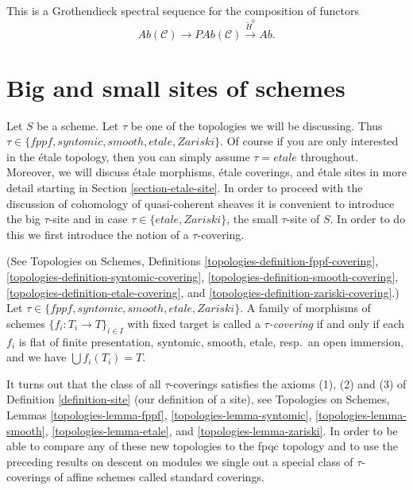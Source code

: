 \begin{remark}
\label{remark-grothendieck-ss}
This is a Grothendieck spectral sequence for the composition of functors
$$
\textit{Ab}(\mathcal{C}) \longrightarrow
\textit{PAb}(\mathcal{C}) \xrightarrow{\check H^0} \textit{Ab}.
$$
\end{remark}








\section{Big and small sites of schemes}
\label{section-big-small}

\noindent
Let $S$ be a scheme.
Let $\tau$ be one of the topologies we will be discussing.
Thus $\tau \in \{fppf, syntomic, smooth, etale, Zariski\}$.
Of course if you are only interested in the \'etale topology, then
you can simply assume $\tau = etale$ throughout. Moreover, we will
discuss \'etale morphisms, \'etale coverings, and \'etale sites
in more detail starting in Section \ref{section-etale-site}.
In order to proceed with the discussion of cohomology of
quasi-coherent sheaves it is convenient to introduce the
big $\tau$-site and in case $\tau \in \{etale, Zariski\}$, the
small $\tau$-site of $S$. In order to do this we first introduce
the notion of a $\tau$-covering.

\begin{definition}
\label{definition-tau-covering}
(See Topologies on Schemes, Definitions
\ref{topologies-definition-fppf-covering},
\ref{topologies-definition-syntomic-covering},
\ref{topologies-definition-smooth-covering},
\ref{topologies-definition-etale-covering}, and
\ref{topologies-definition-zariski-covering}.)
Let $\tau \in \{fppf, syntomic, smooth, etale, Zariski\}$.
A family of morphisms of schemes $\{f_i : T_i \to T\}_{i \in I}$ with fixed
target is called a {\it $\tau$-covering} if and only if
each $f_i$ is flat of finite presentation, syntomic, smooth, etale,
resp.\ an open immersion, and we have $\bigcup f_i(T_i) = T$.
\end{definition}

\noindent
It turns out that the class of all $\tau$-coverings satisfies the axioms
(1), (2) and (3) of
Definition \ref{definition-site} (our definition of a site), see
Topologies on Schemes, Lemmas
\ref{topologies-lemma-fppf},
\ref{topologies-lemma-syntomic},
\ref{topologies-lemma-smooth},
\ref{topologies-lemma-etale}, and
\ref{topologies-lemma-zariski}.
In order to be able to compare any of these new topologies to the fpqc topology
and to use the preceding results on descent on modules we single out a special
class of $\tau$-coverings of affine schemes called standard coverings.


